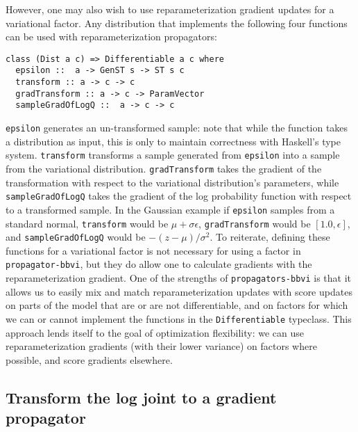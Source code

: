 \documentclass[12pt]{article}
\begin{document}
However, one may also wish to use reparameterization gradient
updates \citep{kuc-2017} for a variational factor. Any distribution
that implements the following four functions can be used with
reparameterization propagators:

\begin{verbatim}
class (Dist a c) => Differentiable a c where
  epsilon ::  a -> GenST s -> ST s c
  transform :: a -> c -> c
  gradTransform :: a -> c -> ParamVector
  sampleGradOfLogQ ::  a -> c -> c
\end{verbatim}

\texttt{epsilon} generates an un-transformed sample: note that while
the function takes a distribution as input, this is only to maintain
correctness with Haskell's type system. \texttt{transform} transforms
a sample generated from \texttt{epsilon} into a sample from the variational
distribution. \texttt{gradTransform} takes the gradient of the
transformation with respect to the variational distribution's parameters, while
\texttt{sampleGradOfLogQ} takes the gradient of the log probability
function with respect to a transformed sample. In the
Gaussian example if \texttt{epsilon} samples from a standard normal,
\texttt{transform} would be $\mu + \sigma \epsilon$,
\texttt{gradTransform} would be $[1.0, \epsilon]$, and
\texttt{sampleGradOfLogQ} would be $-(z - \mu) / \sigma ^ 2$. To
reiterate, defining these functions for a variational factor is not
necessary for using a factor in \texttt{propagator-bbvi}, but they do
allow one to calculate gradients with the reparameterization
gradient. One of the strengths of
\texttt{propagators-bbvi} is that it allows us to easily mix and match
reparameterization updates with score updates on parts of the model
that are or are not differentiable, and on factors for which we can or
cannot implement the functions in the \texttt{Differentiable}
typeclass. This approach lends itself to the goal of optimization
flexibility: we can use reparameterization gradients (with their lower
variance) on factors where possible, and score gradients elsewhere.

\subsection{Transform the log joint to a gradient propagator }
\label{gradient}
\end{document}
